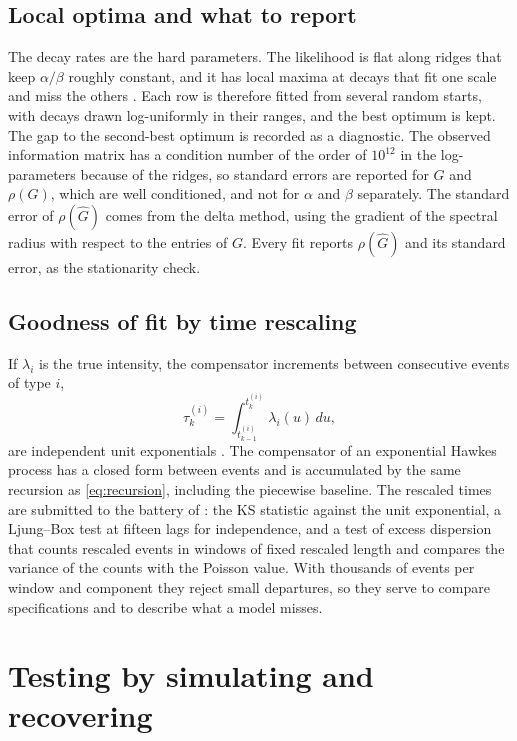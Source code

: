 \documentclass[a4paper,11pt]{article}
\begin{document}
\subsection{Local optima and what to report}

The decay rates are the hard parameters. The likelihood is flat along ridges that keep $\alpha/\beta$ roughly constant, and it has local maxima at decays that fit one scale and miss the others \cite{filimonov2015, lallouache2016}. Each row is therefore fitted from several random starts, with decays drawn log-uniformly in their ranges, and the best optimum is kept. The gap to the second-best optimum is recorded as a diagnostic. The observed information matrix has a condition number of the order of $10^{12}$ in the log-parameters because of the ridges, so standard errors are reported for $G$ and $\rho(G)$, which are well conditioned, and not for $\alpha$ and $\beta$ separately. The standard error of $\rho(\hat G)$ comes from the delta method, using the gradient of the spectral radius with respect to the entries of $G$. Every fit reports $\rho(\hat G)$ and its standard error, as the stationarity check.

\subsection{Goodness of fit by time rescaling}\label{sec:gof}

If $\lambda_i$ is the true intensity, the compensator increments between consecutive events of type $i$,
\begin{equation}\label{eq:rescaling}
\tau^{(i)}_k = \int_{t^{(i)}_{k-1}}^{t^{(i)}_k} \lambda_i(u)\, du,
\end{equation}
are independent unit exponentials \cite{brown2002}. The compensator of an exponential Hawkes process has a closed form between events and is accumulated by the same recursion as \eqref{eq:recursion}, including the piecewise baseline. The rescaled times are submitted to the battery of \cite{lallouache2016}: the KS statistic against the unit exponential, a Ljung--Box test at fifteen lags for independence, and a test of excess dispersion that counts rescaled events in windows of fixed rescaled length and compares the variance of the counts with the Poisson value. With thousands of events per window and component they reject small departures, so they serve to compare specifications and to describe what a model misses.

\section{Testing by simulating and recovering}\label{sec:simulation}
\end{document}
